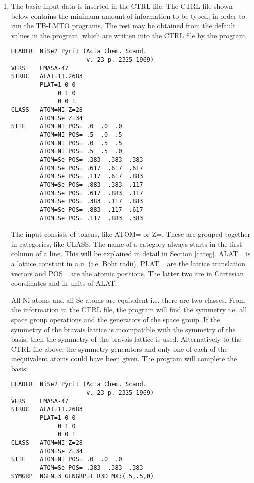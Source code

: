 \documentclass[aps,twocolumn,a4]{revtex4}
\begin{document}
\begin{enumerate}
\item The basic input data is inserted in the CTRL file.
The CTRL file shown below contains the minimum amount of
information to be typed, in order to run the TB-LMTO programs. The rest
may be obtained from the default values in the program, which are
written into the CTRL file by the program.
\begin{verbatim}
HEADER  NiSe2 Pyrit (Acta Chem. Scand.
                     v. 23 p. 2325 1969)
VERS    LMASA-47
STRUC   ALAT=11.2683
        PLAT=1 0 0
             0 1 0
             0 0 1
CLASS   ATOM=NI Z=28
        ATOM=Se Z=34
SITE    ATOM=NI POS= .0  .0  .0
        ATOM=NI POS= .5  .0  .5
        ATOM=NI POS= .0  .5  .5
        ATOM=NI POS= .5  .5  .0
        ATOM=Se POS= .383  .383  .383
        ATOM=Se POS= .617  .617  .617
        ATOM=Se POS= .117  .617  .883
        ATOM=Se POS= .883  .383  .117
        ATOM=Se POS= .617  .883  .117
        ATOM=Se POS= .383  .117  .883
        ATOM=Se POS= .883  .117  .617
        ATOM=Se POS= .117  .883  .383
\end{verbatim}

The input consists of tokens, like ATOM= or Z=. These are grouped
together in categories, like CLASS. The name of a category always
starts in the first column of a
line. This will be explained in detail in Section \ref{categ}.
ALAT= is a lattice constant in a.u. (i.e. Bohr radii),
PLAT= are the lattice
translation vectors and POS= are the atomic positions. The latter two
are in Cartesian coordinates and in units of ALAT.

All Ni atoms and all Se atoms are equivalent i.e. there are two
classes. From the information in the CTRL file, the program will find
the symmetry i.e. all space group operations and the generators of the
space group.  If the symmetry of the bravais lattice is incompatible
with the symmetry of the basis, then the symmetry of the bravais
lattice is used.
Alternatively to the CTRL file above,
the symmetry generators and only one of each of
the inequivalent atoms could have been given. The program will complete
the basis:
\begin{verbatim}
HEADER  NiSe2 Pyrit (Acta Chem. Scand.
                     v. 23 p. 2325 1969)
VERS    LMASA-47
STRUC   ALAT=11.2683
        PLAT=1 0 0
             0 1 0
             0 0 1
CLASS   ATOM=NI Z=28
        ATOM=Se Z=34
SITE    ATOM=NI POS= .0  .0  .0
        ATOM=Se POS= .383  .383  .383
SYMGRP  NGEN=3 GENGRP=I R3D MX:(.5,.5,0)
\end{verbatim}


\end{enumerate}
\end{document}
